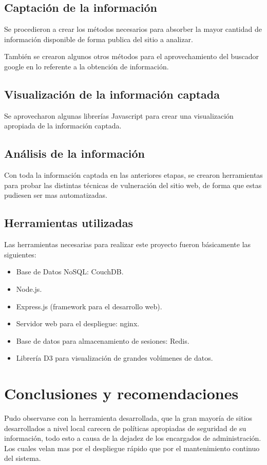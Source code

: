 \documentclass[letter,twoside,11pt]{article}
\begin{document}
\subsection{Captación de la información}
Se procedieron a crear los métodos necesarios para absorber la mayor cantidad de
información disponible de forma publica del sitio a analizar.

También se crearon algunos otros métodos para el aprovechamiento del buscador
google en lo referente a la obtención de información.

\subsection{Visualización de la información captada}
Se aprovecharon algunas librerías Javascript para crear una visualización
apropiada de la información captada.

\subsection{Análisis de la información}
Con toda la información captada en las anteriores etapas, se crearon
herramientas para probar las distintas técnicas de vulneración del sitio web, de
forma que estas pudiesen ser mas automatizadas.

\subsection{Herramientas utilizadas}
Las herramientas necesarias para realizar este proyecto fueron básicamente las
siguientes:

\begin{itemize}
    \item Base de Datos NoSQL: CouchDB.
    \item Node.js.
    \item Express.js (framework para el desarrollo web).
    \item Servidor web para el despliegue: nginx.
    \item Base de datos para almacenamiento de sesiones: Redis.
    \item Librería D3 para visualización de grandes volúmenes de datos.
\end{itemize}

\section{Conclusiones y recomendaciones}
Pudo observarse con la herramienta desarrollada, que la gran mayoría de sitios
desarrollados a nivel local carecen de políticas apropiadas de seguridad de su
información, todo esto a causa de la dejadez de los encargados de
administración. Los cuales velan mas por el despliegue rápido que por el
mantenimiento continuo del sistema.
\end{document}
